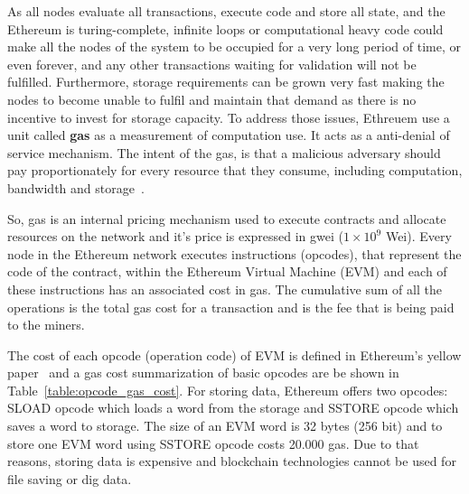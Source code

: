 As all nodes evaluate all transactions, execute code and store all state, and the Ethereum is turing-complete, infinite loops or computational heavy code could make all the nodes of the system to be occupied for a very long period of time, or even forever, and any other transactions waiting for validation will not be fulfilled. Furthermore, storage requirements can be grown very fast making the nodes to become unable to fulfil and maintain that demand as there is no incentive to invest for storage capacity. To address those issues, Ethreuem use a unit called \textbf{gas} as a measurement of computation use. It acts as a anti-denial of service mechanism. The intent of the gas, is that a malicious adversary should pay proportionately for every resource that they consume, including computation, bandwidth and storage~\cite{ethereum_whitepaper}.

So, gas is an internal pricing mechanism used to execute contracts and allocate resources on the network and it's price is expressed in gwei ($1 \times 10^9$ Wei). Every node in the Ethereum network executes instructions (opcodes), that represent the code of the contract, within the Ethereum Virtual Machine (EVM) and each of these instructions has an associated cost in gas. The cumulative sum of all the operations is the total gas cost for a transaction and is the fee that is being paid to the miners.

The cost of each opcode (operation code) of EVM is defined in Ethereum's yellow paper~\cite{ethereum_yellowpaper} and a gas cost summarization of basic opcodes are be shown in Table~\ref{table:opcode_gas_cost}. For storing data, Ethereum offers two opcodes: SLOAD opcode which loads a word from the storage and SSTORE opcode which saves a word to storage. The size of an EVM word is 32 bytes (256 bit) and to store one EVM word using SSTORE opcode costs 20.000 gas. Due to that reasons, storing data is expensive and blockchain technologies cannot be used for file saving or dig data.

